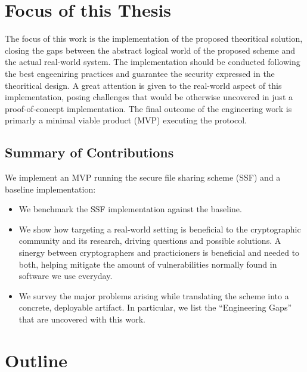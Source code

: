 \section{Focus of this Thesis}

The focus of this work is the implementation of the proposed theoritical solution,
closing the gaps between the abstract logical world of the proposed scheme
and the actual real-world system.
The implementation should be conducted following the best engeeniring practices 
and guarantee the security expressed in the theoritical design.
A great attention is given to the real-world aspect of this implementation,
posing challenges that would be otherwise uncovered in just a proof-of-concept implementation.
The final outcome of the engineering work is primarly a minimal viable product (MVP) executing the protocol.

\subsection{Summary of Contributions}

We implement an MVP running the secure file sharing scheme (SSF) and a baseline implementation:

\begin{itemize}
    \item We benchmark the SSF implementation against the baseline.
    \item We show how targeting a real-world setting is beneficial to the cryptographic community and its research, driving questions and possible solutions. A sinergy between cryptographers and practicioners is beneficial and needed to both, helping mitigate the amount of vulnerabilities normally found in software we use everyday.
    \item We survey the major problems arising while translating the scheme into a concrete, deployable artifact. In particular, we list the ``Engineering Gaps'' that are uncovered with this work.
\end{itemize}

\section{Outline}